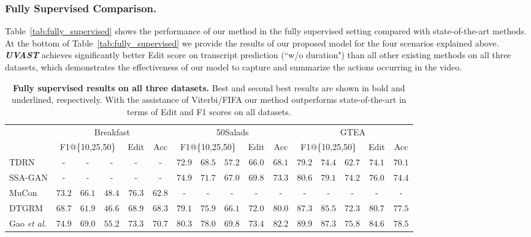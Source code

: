 \subsubsection{Fully Supervised Comparison.}
Table~\ref{tab:fully_supervised} shows the performance of our method in the fully supervised setting compared with state-of-the-art methods.
At the bottom of Table~\ref{tab:fully_supervised} we provide the results of our proposed model for the four scenarios explained above. 
\textit{\textbf{UVAST}} achieves significantly better Edit score on transcript prediction (``w/o duration") than all other existing methods on all three datasets, which demonstrates the effectiveness of our model to capture and summarize the actions occurring in the video. 
\begin{table}[t]
\centering
\caption{\textbf{Fully supervised results on all three datasets.} Best and second best results are shown in bold and underlined, respectively. With the assistance of Viterbi/FIFA our method outperforms state-of-the-art in terms of Edit and F1 scores on all datasets.}
\resizebox{\textwidth}{!} {
\begin{tabular}{ll|ccc|c|c||ccc|c|c||ccc|c|c}
\hline 
\hline 
\multicolumn{2}{l|}{} & \multicolumn{5}{c||}{{Breakfast}} & \multicolumn{5}{c||}{{50Salads}} & \multicolumn{5}{c}{{GTEA}}\\
\cline{3-17} 
 &  & \multicolumn{3}{c|}{{F1@\{10,25,50\}}} & Edit & Acc & \multicolumn{3}{c|}{{F1@\{10,25,50\}}} & Edit & Acc & \multicolumn{3}{c|}{{F1@\{10,25,50\}}} & Edit & Acc \\
\hline 
\multicolumn{2}{l|}{TDRN \cite{lei2018temporal}} & - & - & - & - & - & $72.9$ & $68.5$ & $57.2$ & $66.0$ & $68.1$ & $79.2$ & $74.4$ & $62.7$ & $74.1$ & $70.1$ \\
\multicolumn{2}{l|}{SSA-GAN \cite{gammulle2020fine}} & - & - & - & - & - & $74.9$ & $71.7$ & $67.0$ & $69.8$ & $73.3$ & $80.6$ & $79.1$ & $74.2$ & $76.0$ & $74.4$\\
\multicolumn{2}{l|}{MuCon \cite{Souri:2021:MuCon}} & $73.2$ & $66.1$ & $48.4$ & $76.3$ & $62.8$ & - & - & - & - & - & - & - & - & - & -\\
\multicolumn{2}{l|}{{DTGRM \cite{wang2020temporal}}} & $68.7$ & $61.9$ & $46.6$ & $68.9$ & $68.3$ & $79.1$ & $75.9$ & $66.1$ & $72.0$ & $80.0$ & $87.3$ & $85.5$ & $72.3$ & $80.7$ & $77.5$\\
\multicolumn{2}{l|}{Gao  \textit{et al.} \cite{gao2021global2local}} & $74.9$ & $69.0$ & $55.2$ & $73.3$ & $70.7$ & $80.3$ & $78.0$ & $69.8$ & $73.4$ & $82.2$ & $89.9$ & $87.3$ & $75.8$ & $84.6$ & $78.5$\\

\end{tabular}}
\end{table}
